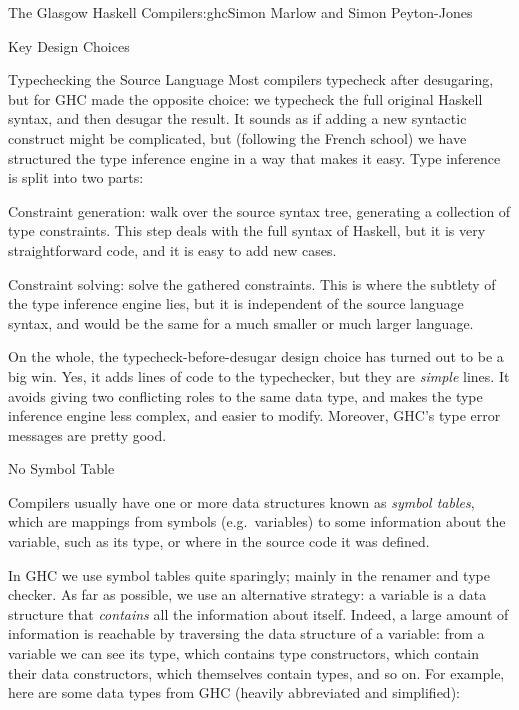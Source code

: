 \begin{aosachapter}{The Glasgow Haskell Compiler}{s:ghc}{Simon Marlow and Simon Peyton-Jones}
\begin{aosasect1}{Key Design Choices}
\begin{aosasect2}{Typechecking the Source Language}
Most compilers typecheck after desugaring, but for GHC made the
opposite choice: we typecheck the full original Haskell syntax, and
then desugar the result.  It sounds as if adding a new syntactic
construct might be complicated, but (following the French school) we
have structured the type inference engine in a way that makes it
easy. Type inference is split into two parts:

\begin{aosaenumerate}

\item Constraint generation: walk over the source syntax tree,
  generating a collection of type constraints.  This step deals with
  the full syntax of Haskell, but it is very straightforward code, and
  it is easy to add new cases.

\item Constraint solving: solve the gathered constraints.  This is
  where the subtlety of the type inference engine lies, but it is
  independent of the source language syntax, and would be the same for
  a much smaller or much larger language.

\end{aosaenumerate}

On the whole, the typecheck-before-desugar design choice has turned
out to be a big win.  Yes, it adds lines of code to the typechecker,
but they are \emph{simple} lines. It avoids giving two conflicting
roles to the same data type, and makes the type inference engine less
complex, and easier to modify. Moreover, GHC's type error messages are
pretty good.

\end{aosasect2}

\begin{aosasect2}{No Symbol Table}

Compilers usually have one or more data structures known as
\emph{symbol tables}, which are mappings from symbols
(e.g.\ variables) to some information about the variable, such as its
type, or where in the source code it was defined.

In GHC we use symbol tables quite sparingly; mainly in the renamer and
type checker.  As far as possible, we use an alternative strategy: a
variable is a data structure that \emph{contains} all the information
about itself.  Indeed, a large amount of information is reachable by
traversing the data structure of a variable: from a variable we can
see its type, which contains type constructors, which contain their
data constructors, which themselves contain types, and so on.  For
example, here are some data types from GHC (heavily abbreviated and
simplified):


\end{aosasect2}
\end{aosasect1}
\end{aosachapter}
